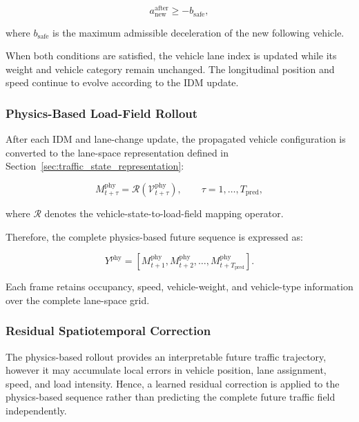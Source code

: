 \documentclass[journal]{IEEEtran}
\begin{document}
\begin{equation}
a_{\mathrm{new}}^{\mathrm{after}}
\geq
-b_{\mathrm{safe}},
\end{equation}

where $b_{\mathrm{safe}}$ is the maximum admissible deceleration of the new following vehicle.

When both conditions are satisfied, the vehicle lane index is updated while its weight and vehicle category remain unchanged. The longitudinal position and speed continue to evolve according to the IDM update.


\subsubsection{Physics-Based Load-Field Rollout}

After each IDM and lane-change update, the propagated vehicle configuration is converted to the lane-space representation defined in Section~\ref{sec:traffic_state_representation}:

\begin{equation}
M_{t+\tau}^{\mathrm{phy}}
=
\mathcal{R}\left(
\mathcal{V}_{t+\tau}^{\mathrm{phy}}
\right),
\qquad
\tau=1,\ldots,T_{\mathrm{pred}},
\end{equation}

where $\mathcal{R}$ denotes the vehicle-state-to-load-field mapping operator.

Therefore, the complete physics-based future sequence is expressed as:

\begin{equation}
Y^{\mathrm{phy}}
=
\left[
M_{t+1}^{\mathrm{phy}},
M_{t+2}^{\mathrm{phy}},
\ldots,
M_{t+T_{\mathrm{pred}}}^{\mathrm{phy}}
\right].
\end{equation}

Each frame retains occupancy, speed, vehicle-weight, and vehicle-type information over the complete lane-space grid.


\subsubsection{Residual Spatiotemporal Correction}

The physics-based rollout provides an interpretable future traffic trajectory, however it may accumulate local errors in vehicle position, lane assignment, speed, and load intensity. Hence, a learned residual correction is applied to the physics-based sequence rather than predicting the complete future traffic field independently.
\end{document}
